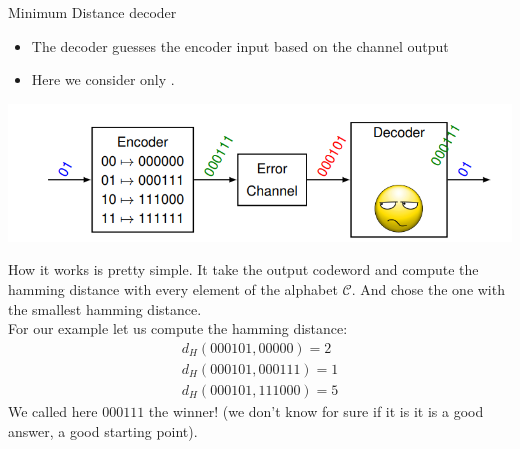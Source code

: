 \begin{parag}{Minimum Distance decoder}
    
    \begin{itemize}
        \item The decoder guesses the encoder input based on the channel output
        \item Here we consider only .
    \end{itemize}
    \begin{center}
        \includegraphics[scale=0.8]{52025-04-29.png}
    \end{center}
    
    How it works is pretty simple. It take the output codeword and compute the hamming distance with every element of the alphabet $\mathcal{C}$. And chose the one with the smallest hamming distance.\\
 For our example let us compute the hamming distance:
 \begin{align*} d_H\left(000101, 00000\right) = 2\\
 d_H\left(000101, 000111\right) = 1\\
d_H\left(000101, 111000\right) = 5\end{align*}
We called here $000111$ the winner! (we don't know for sure if it is  it is a good answer, a good starting point).
\end{parag}

